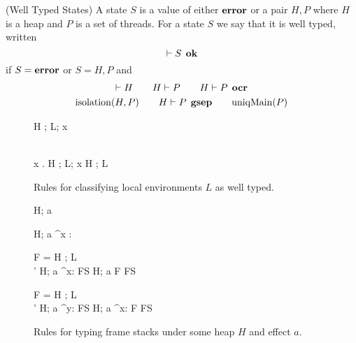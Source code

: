 \begin{definition}{(Well Typed States)}
  A state $S$ is a value of either $\mbox{{\bf error}}$ or a pair $H, P$ where $H$ is a heap
  and $P$ is a set of threads. For a state $S$ we say that it is well typed,
  written
  \begin{equation}
    \vdash S \:\: \mbox{\bf ok}
  \end{equation}
  if $S = \mbox{{\bf error}}$ or $S = H, P$ and
  \begin{equation*}
    \begin{gathered}
      \vdash H \quad\quad H \vdash P \quad\quad H \vdash P \:\: \mbox{\bf ocr} \\
      \mbox{$\mathrm{isolation}$}{(H, P)} \quad\quad H \vdash P \:\: \mbox{\bf gsep} \quad\quad \mbox{$\mathrm{uniqMain}$}(P)
    \end{gathered}
  \end{equation*}
  
\end{definition}

\begin{figure}
  {}
  { H \vdash \Gamma; L; x }

  \RuleSpace{}

  {\dom{(\Gamma)} \subseteq {} \\
    \forall x \in \dom{(\Gamma)}. \: H \vdash \Gamma; L; x 
  }
  { H \vdash \Gamma; L }

  \caption{Rules for classifying local environments $L$ as well typed.}
  \label{fig:local_typing}
\end{figure}

\begin{figure}
  {H; a \vdash \varepsilon}

  \RuleSpace{}

  {H; a \vdash^{x : \sigma} \varepsilon}

  \RuleSpace{}

  { F =  \andalso H \vdash \Gamma; L \\
   \andalso \sigma' \stof \sigma \andalso H; a \vdash^{x: \sigma} FS }
  { H; a \vdash F \circ FS }
  
  \RuleSpace{}

  { F =  \andalso H \vdash \Gamma; L \\
   \andalso \sigma' \stof \sigma 
  \andalso H; a \vdash^{y: \sigma} FS }
  { H; a \vdash^{x: \tau} F \circ FS }

  \caption{Rules for typing frame stacks under some heap $H$ and effect $a$.}
  \label{fig:fs_typing}
\end{figure}

